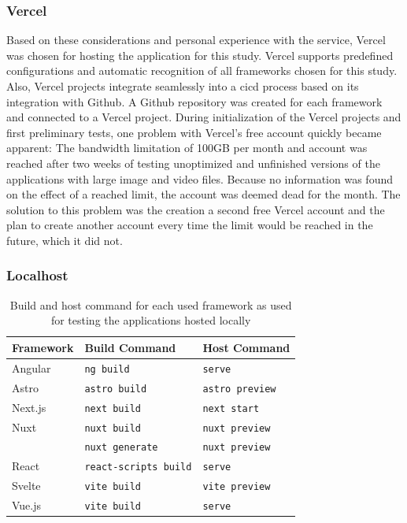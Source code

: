 \documentclass[a4paper, 12pt]{article}
\begin{document}
\subsubsection{Vercel}
Based on these considerations and personal experience with the service, Vercel was chosen for hosting the application for this study.
Vercel supports predefined configurations and automatic recognition of all frameworks chosen for this study.
Also, Vercel projects integrate seamlessly into a \acrshort{cicd} process based on its integration with Github.
A Github repository was created for each framework and connected to a Vercel project.
During initialization of the Vercel projects and first preliminary tests, one problem with Vercel's free account quickly became apparent:
The bandwidth limitation of 100GB per month and account was reached after two weeks of testing unoptimized and unfinished versions of the applications with large image and video files.
Because no information was found on the effect of a reached limit, the account was deemed dead for the month.
The solution to this problem was the creation a second free Vercel account and the plan to create another account every time the limit would be reached in the future, which it did not.

\subsubsection{Localhost}
\begin{table}[h]
  \begin{center}
    \begin{tabular}[h]{| l | l | l |}
      \hline
      \textbf{Framework} & \textbf{Build Command} & \textbf{Host Command} \\ \hline
      Angular & \verb|ng build| & \verb|serve| \\ \hline
      Astro & \verb|astro build| & \verb|astro preview| \\ \hline
      Next.js & \verb|next build| & \verb|next start| \\ \hline
      Nuxt & \verb|nuxt build| & \verb|nuxt preview| \\
      & \verb|nuxt generate| & \verb|nuxt preview| \\ \hline
      React & \verb|react-scripts build| & \verb|serve| \\ \hline
      Svelte & \verb|vite build| & \verb|vite preview| \\ \hline
      Vue.js & \verb|vite build| & \verb|serve| \\ \hline
    \end{tabular}
  \end{center}
  \caption{Build and host command for each used framework as used for testing the applications hosted locally}\label{tab:hostCommands}
\end{table}
\end{document}
